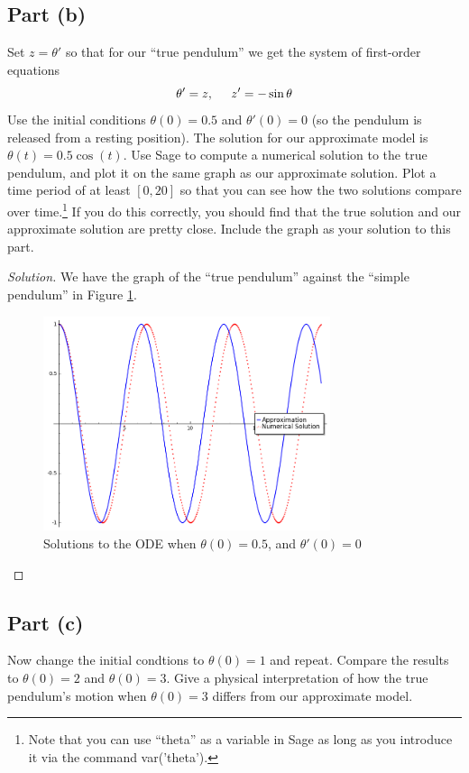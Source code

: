 \documentclass[letterpaper, 12pt]{amsart}
\theoremstyle{definition}  							%
\begin{document}
		\subsection*{Part (b)}
		Set $z = \theta'$ so that for our ``true pendulum'' we get the system of first-order equations $$\theta' = z, \hspace{5mm} z' = -\sin\theta$$
		Use the initial conditions $\theta(0) = 0.5$ and $\theta'(0) = 0$ (so the pendulum is released from a resting position). 
		The solution for our approximate model is $\theta(t) = 0.5 \cos(t)$. 
		Use Sage to compute a numerical solution to the true pendulum, and plot it on the same graph as our approximate solution. 
		Plot a time period of at least $[0, 20]$ so that you can see how the two solutions compare over time.\footnote{Note that you can use “theta” as a variable in Sage as long as you introduce it via the command var('theta').}
		If you do this correctly, you should find that the true solution and our approximate solution are pretty close. Include the graph as your solution to this part.

		\begin{proof}[Solution]
		We have the graph of the ``true pendulum'' against the ``simple pendulum'' in Figure \ref{theta1}.

			\begin{figure}[b]
				\includegraphics[width=0.75\textwidth]{images/theta1.png}
				\caption{Solutions to the ODE when $\theta(0)=0.5$, and $\theta'(0)=0$}
				\label{theta1}
			\end{figure}
		\end{proof}

		\subsection*{Part (c)}
		Now change the initial condtions to $\theta(0) = 1$ and repeat. 
		Compare the results to $\theta(0) = 2$ and $\theta(0) = 3$. 
		Give a physical interpretation of how the true pendulum's motion when $\theta(0) = 3$ differs from our approximate model.
\end{document}
